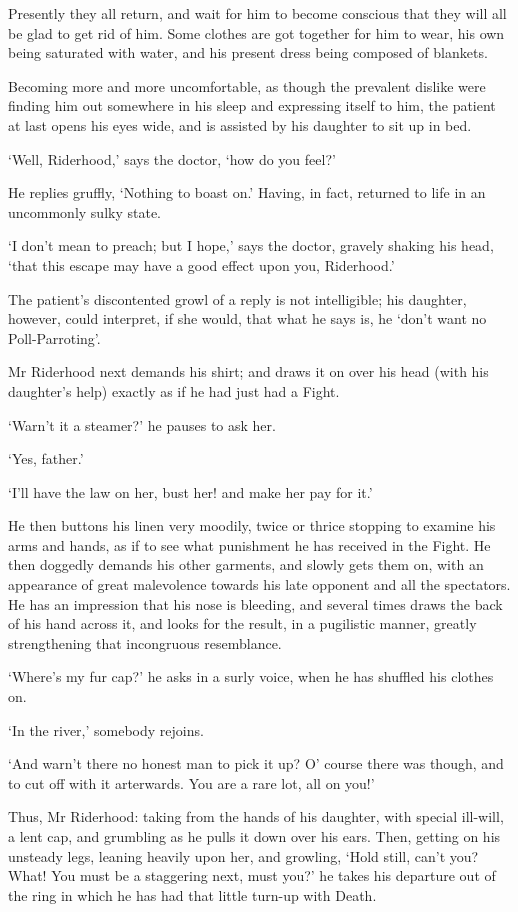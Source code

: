 Presently they all return, and wait for him to become conscious that
they will all be glad to get rid of him. Some clothes are got together
for him to wear, his own being saturated with water, and his present
dress being composed of blankets.

Becoming more and more uncomfortable, as though the prevalent dislike
were finding him out somewhere in his sleep and expressing itself to
him, the patient at last opens his eyes wide, and is assisted by his
daughter to sit up in bed.

‘Well, Riderhood,’ says the doctor, ‘how do you feel?’

He replies gruffly, ‘Nothing to boast on.’ Having, in fact, returned to
life in an uncommonly sulky state.

‘I don’t mean to preach; but I hope,’ says the doctor, gravely shaking
his head, ‘that this escape may have a good effect upon you, Riderhood.’

The patient’s discontented growl of a reply is not intelligible; his
daughter, however, could interpret, if she would, that what he says is,
he ‘don’t want no Poll-Parroting’.

Mr Riderhood next demands his shirt; and draws it on over his head (with
his daughter’s help) exactly as if he had just had a Fight.

‘Warn’t it a steamer?’ he pauses to ask her.

‘Yes, father.’

‘I’ll have the law on her, bust her! and make her pay for it.’

He then buttons his linen very moodily, twice or thrice stopping to
examine his arms and hands, as if to see what punishment he has received
in the Fight. He then doggedly demands his other garments, and slowly
gets them on, with an appearance of great malevolence towards his late
opponent and all the spectators. He has an impression that his nose is
bleeding, and several times draws the back of his hand across it, and
looks for the result, in a pugilistic manner, greatly strengthening that
incongruous resemblance.

‘Where’s my fur cap?’ he asks in a surly voice, when he has shuffled his
clothes on.

‘In the river,’ somebody rejoins.

‘And warn’t there no honest man to pick it up? O’ course there was
though, and to cut off with it arterwards. You are a rare lot, all on
you!’

Thus, Mr Riderhood: taking from the hands of his daughter, with special
ill-will, a lent cap, and grumbling as he pulls it down over his ears.
Then, getting on his unsteady legs, leaning heavily upon her, and
growling, ‘Hold still, can’t you? What! You must be a staggering next,
must you?’ he takes his departure out of the ring in which he has had
that little turn-up with Death.



